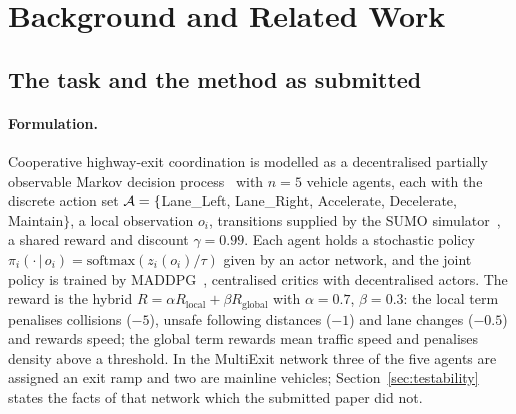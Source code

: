 \section{Background and Related Work}
\label{sec:background}

\subsection{The task and the method as submitted}
\label{sec:bg_method}

\paragraph{Formulation.}
Cooperative highway-exit coordination is modelled as a decentralised partially observable Markov decision process~\cite{oliehoek2016concise} with $n=5$ vehicle agents, each with the discrete action set $\mathcal{A}=\{$Lane\_Left, Lane\_Right, Accelerate, Decelerate, Maintain$\}$, a local observation $o_i$, transitions supplied by the SUMO simulator~\cite{lopez2018microscopic}, a shared reward and discount $\gamma=0.99$. Each agent holds a stochastic policy $\pi_i(\cdot\,|\,o_i)=\mathrm{softmax}(z_i(o_i)/\tau)$ given by an actor network, and the joint policy is trained by MADDPG~\cite{lowe2017multi}, centralised critics with decentralised actors. The reward is the hybrid $R=\alpha R_{\mathrm{local}}+\beta R_{\mathrm{global}}$ with $\alpha=0.7$, $\beta=0.3$: the local term penalises collisions ($-5$), unsafe following distances ($-1$) and lane changes ($-0.5$) and rewards speed; the global term rewards mean traffic speed and penalises density above a threshold. In the MultiExit network three of the five agents are assigned an exit ramp and two are mainline vehicles; Section~\ref{sec:testability} states the facts of that network which the submitted paper did not.

